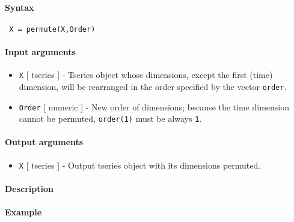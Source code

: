 


	\paragraph{Syntax}
 
 \begin{verbatim}
 X = permute(X,Order)
 \end{verbatim}
 
 \paragraph{Input arguments}
 
 \begin{itemize}
 \item
   \texttt{X} {[} tseries {]} - Tseries object whose dimensions, except
   the first (time) dimension, will be rearranged in the order specified
   by the vector \texttt{order}.
 \item
   \texttt{Order} {[} numeric {]} - New order of dimensions; because the
   time dimension cannot be permuted, \texttt{order(1)} must be always
   \texttt{1}.
 \end{itemize}
 
 \paragraph{Output arguments}
 
 \begin{itemize}
 \item
   \texttt{X} {[} tseries {]} - Output tseries object with its dimensions
   permuted.
 \end{itemize}
 
 \paragraph{Description}
 
 \paragraph{Example}


